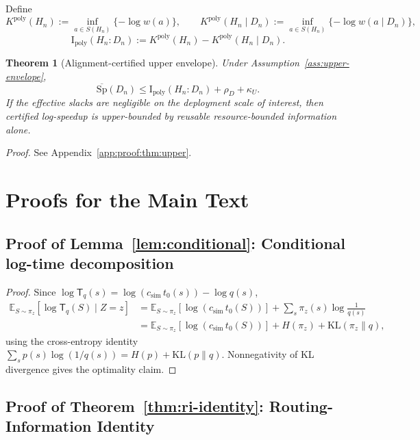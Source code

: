 \documentclass[10pt]{article}
\theoremstyle{paperplain}
\newtheorem{theorem}{Theorem}[section]
\theoremstyle{paperdefinition}
\theoremstyle{paperremark}
\newcommand{\poly}{\mathrm{poly}}
\newcommand{\KL}{\mathrm{KL}}
\newcommand{\I}{\mathrm{I}}
\newcommand{\E}{\mathbb{E}}
\newcommand{\Sp}{\mathrm{Sp}}
\begin{document}
Define
\[
K^{\poly}(H_n):=\inf_{a\in S(H_n)}\{-\log w(a)\},
\qquad
K^{\poly}(H_n\mid D_n):=\inf_{a\in S(H_n)}\{-\log w(a\mid D_n)\},
\]
\[
\I_{\mathrm{poly}}(H_n:D_n):=K^{\poly}(H_n)-K^{\poly}(H_n\mid D_n).
\]

\begin{theorem}[Alignment-certified upper envelope]\label{thm:upper}\label{thm:upper-expectation}
Under Assumption~\ref{ass:upper-envelope},
\[
\overline{\Sp}(D_n)
\le
\I_{\mathrm{poly}}(H_n:D_n)+\rho_D+\kappa_U.
\]
If the effective slacks are negligible on the deployment scale of interest, then certified log-speedup is upper-bounded by reusable resource-bounded information alone.
\end{theorem}

\par\noindent\emph{Proof.} See Appendix~\ref{app:proof:thm:upper}.\par



\section{Proofs for the Main Text}
\label{app:main-proofs}

\subsection{Proof of Lemma~\ref{lem:conditional}: Conditional log-time decomposition}
\label{app:proof:lem:conditional}

\begin{proof}
Since $\log \mathsf{T}_q(s) = \log(c_{\mathrm{sim}}\, t_0(s)) - \log q(s)$,
\[
\begin{aligned}
\E_{S \sim \pi_z}\!\left[\log \mathsf{T}_q(S) \mid Z=z\right]
&= \E_{S\sim\pi_z}[\log(c_{\mathrm{sim}}\, t_0(S))]
   + \sum_s \pi_z(s) \log \frac{1}{q(s)} \\
&= \E_{S\sim\pi_z}[\log(c_{\mathrm{sim}}\, t_0(S))]
   + H(\pi_z) + \KL(\pi_z \| q),
\end{aligned}
\]
using the cross-entropy identity $\sum_s p(s)\log(1/q(s)) = H(p) + \KL(p\|q)$.
Nonnegativity of KL divergence gives the optimality claim.
\end{proof}

\subsection{Proof of Theorem~\ref{thm:ri-identity}: Routing-Information Identity}
\label{app:proof:thm:ri-identity}
\end{document}
